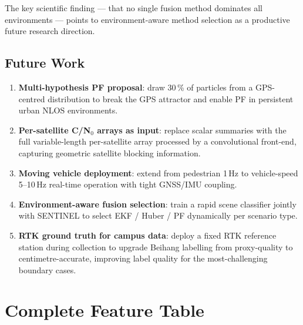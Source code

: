 \documentclass[12pt,a4paper]{article}
\begin{document}
The key scientific finding --- that no single fusion method dominates all environments
--- points to environment-aware method selection as a productive future research
direction.

\subsection{Future Work}

\begin{enumerate}
  \item \textbf{Multi-hypothesis PF proposal}: draw 30\,\% of particles from a
    GPS-centred distribution to break the GPS attractor and enable PF in persistent
    urban NLOS environments.
  \item \textbf{Per-satellite C/N$_0$ arrays as input}: replace scalar summaries
    with the full variable-length per-satellite array processed by a convolutional
    front-end, capturing geometric satellite blocking information.
  \item \textbf{Moving vehicle deployment}: extend from pedestrian 1\,Hz to
    vehicle-speed 5--10\,Hz real-time operation with tight GNSS/IMU coupling.
  \item \textbf{Environment-aware fusion selection}: train a rapid scene classifier
    jointly with SENTINEL to select EKF / Huber / PF dynamically per scenario type.
  \item \textbf{RTK ground truth for campus data}: deploy a fixed RTK reference
    station during collection to upgrade Beihang labelling from proxy-quality to
    centimetre-accurate, improving label quality for the most-challenging boundary cases.
\end{enumerate}

\appendix

\section{Complete Feature Table}
\label{app:features}
\end{document}
